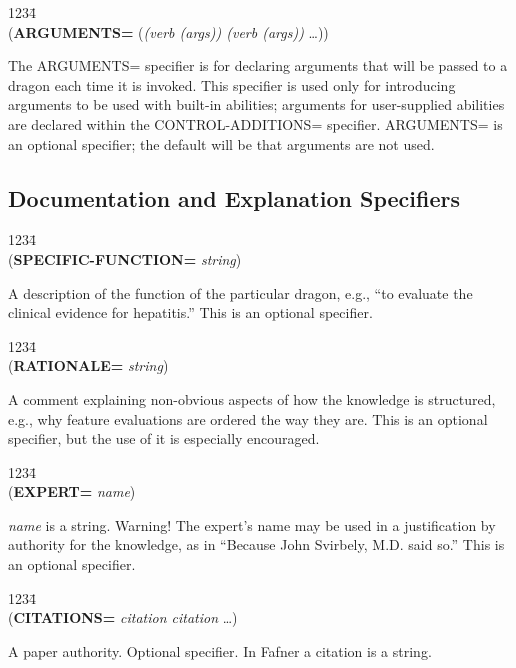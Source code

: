 \begin{tabbing}
1234\= \kill
\\
({\bf ARGUMENTS=} ({\it (verb (args)) (verb (args))\/} \ldots))\\
\end{tabbing}
The ARGUMENTS= specifier is for declaring arguments that will be
passed to a dragon each time it is invoked.  This specifier is used
only for introducing arguments to be used with built-in abilities;
arguments for user-supplied abilities are declared within the
CONTROL-ADDITIONS= specifier.  ARGUMENTS= is an optional
specifier; the default will be that arguments are not used.





\subsection{Documentation and Explanation Specifiers}

\begin{tabbing}
1234\= \kill
\\
({\bf SPECIFIC-FUNCTION=} {\it string\/}) \\
\end{tabbing}
A description of the function of the particular dragon, e.g., ``to
evaluate the clinical evidence for hepatitis.''  This is an optional
specifier.

\begin{tabbing}
1234\= \kill
\\
({\bf RATIONALE=} {\it string\/}) \\
\end{tabbing}
A comment explaining non-obvious aspects of how the knowledge is
structured, e.g., why feature evaluations are ordered the way they are.
This is an optional specifier, but the use of it is especially
encouraged.

\begin{tabbing}
1234\= \kill
\\
({\bf EXPERT=} {\it name\/}) \\
\end{tabbing}
{\it name\/} is a string.  Warning!  The expert's name may be used in
a justification by authority for the knowledge, as in ``Because John
Svirbely, M.D. said so.''  This is an optional specifier.

\begin{tabbing}
1234\= \kill
\\
({\bf CITATIONS=} {\it citation citation\/} \ldots) \\
\end{tabbing}
A paper authority.  Optional specifier.  In Fafner a citation is a
string.


